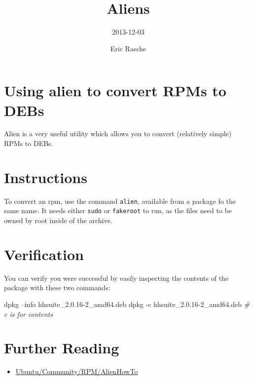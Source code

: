 \documentclass[]{article}
\title{Aliens}
\author{2013-12-03}
\date{Eric Rasche}
\newenvironment{Shaded}{}{}
\newcommand{\CommentTok}[1]{\textcolor[rgb]{0.38,0.63,0.69}{\textit{{#1}}}}
\newcommand{\NormalTok}[1]{{#1}}
\begin{document}
\maketitle

\section{Using alien to convert RPMs to DEBs}

Alien is a very useful utility which allows you to convert (relatively
simple) RPMs to DEBs.

\section{Instructions}

To convert an rpm, use the command \texttt{alien}, available from a
package fo the same name. It needs either \texttt{sudo} or
\texttt{fakeroot} to run, as the files need to be owned by root inside
of the archive.

\begin{Shaded}
\end{Shaded}
\section{Verification}

You can verify you were successful by easily inspecting the contents of
the package with these two commands:

\begin{Shaded}
\begin{Highlighting}[]
\NormalTok{dpkg --info hhsuite_2.0.16-2_amd64.deb}
\NormalTok{dpkg -c hhsuite_2.0.16-2_amd64.deb }\CommentTok{# c is for contents}
\end{Highlighting}
\end{Shaded}
\section{Further Reading}

\begin{itemize}
\item
  \href{https://help.ubuntu.com/community/RPM/AlienHowto}{Ubuntu/Community/RPM/AlienHowTo}
\end{itemize}
\end{document}
